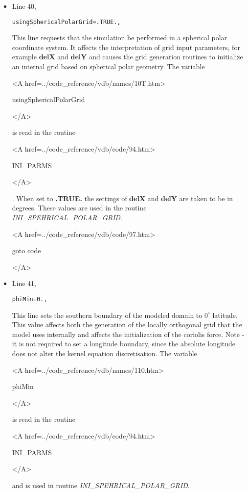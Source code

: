 \begin{itemize}
\item Line 40,
\begin{verbatim}
usingSphericalPolarGrid=.TRUE.,
\end{verbatim}
This line requests that the simulation be performed in a 
spherical polar coordinate system. It affects the interpretation of
grid input parameters, for example {\bf delX} and {\bf delY} and
causes the grid generation routines to initialize an internal grid based
on spherical polar geometry.
The variable
{\bf
\begin{rawhtml} <A href=../code_reference/vdb/names/10T.htm> \end{rawhtml}
usingSphericalPolarGrid
\begin{rawhtml} </A>\end{rawhtml}
}
is read in the routine
{\it
\begin{rawhtml} <A href=../code_reference/vdb/code/94.htm> \end{rawhtml}
INI\_PARMS
\begin{rawhtml} </A>\end{rawhtml}
}. When set to {\bf .TRUE.} the settings of {\bf delX} and {\bf delY} are
taken to be in degrees. These values are used in the
routine {\it INI\_SPEHRICAL\_POLAR\_GRID}.

{\bf
\begin{rawhtml} <A href=../code_reference/vdb/code/97.htm> \end{rawhtml}
goto code
\begin{rawhtml} </A>\end{rawhtml}
}

\item Line 41,
\begin{verbatim}
phiMin=0.,
\end{verbatim}
This line sets the southern boundary of the modeled
domain to $0^{\circ}$ latitude. This value affects both the
generation of the locally orthogonal grid that the model
uses internally and affects the initialization of the coriolis force.
Note - it is not required to set
a longitude boundary, since the absolute longitude does
not alter the kernel equation discretisation.
The variable
{\bf
\begin{rawhtml} <A href=../code_reference/vdb/names/110.htm> \end{rawhtml}
phiMin
\begin{rawhtml} </A>\end{rawhtml}
}
is read in the routine
{\it
\begin{rawhtml} <A href=../code_reference/vdb/code/94.htm> \end{rawhtml}
INI\_PARMS
\begin{rawhtml} </A>\end{rawhtml}
} and is used in routine {\it INI\_SPEHRICAL\_POLAR\_GRID}.


\end{itemize}
